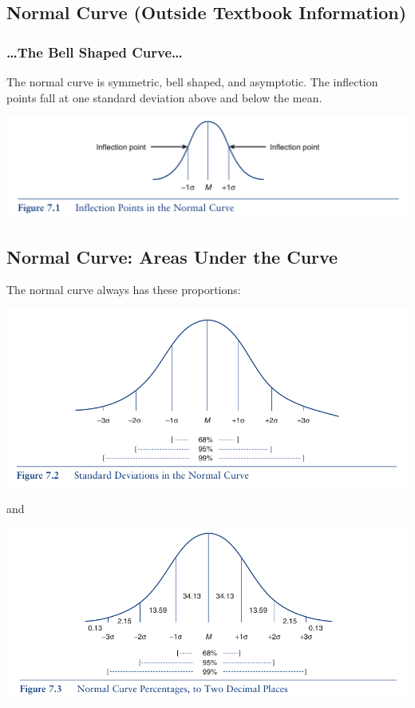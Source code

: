 \documentclass[]{article}
\begin{document}
\subsection{Normal Curve (Outside Textbook
Information)}\label{normal-curve-outside-textbook-information}

\subsubsection{\ldots{}The Bell Shaped
Curve\ldots{}}\label{the-bell-shaped-curve}

The normal curve is symmetric, bell shaped, and asymptotic. The
inflection points fall at one standard deviation above and below the
mean.

\includegraphics{normalcurve.png}

\subsection{Normal Curve: Areas Under the
Curve}\label{normal-curve-areas-under-the-curve}

The normal curve always has these proportions:

\includegraphics{normalcurveareas1.png}

and

\includegraphics{normalcurveareas2.png}
\end{document}
